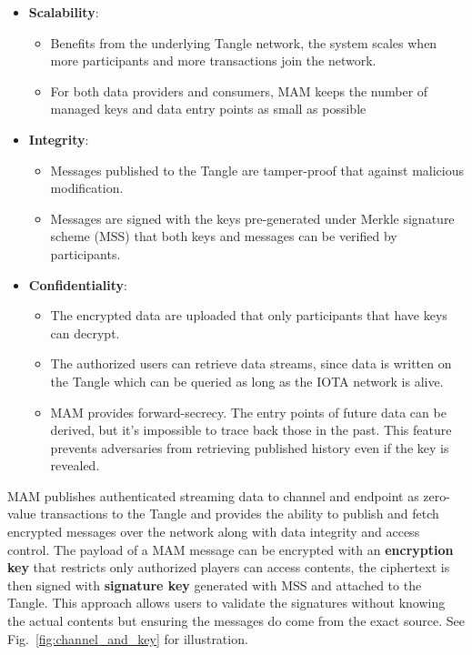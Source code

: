 \documentclass[conference]{IEEEtran}
\begin{document}
\begin{itemize}
    \item \textbf{Scalability}:
	\begin{itemize}
		\item Benefits from the underlying Tangle network, the system scales when more participants and more transactions join the network. 
    	\item For both data providers and consumers, MAM keeps the number of managed keys and data entry points as small as possible
    \end{itemize}    
    \item \textbf{Integrity}: 
	\begin{itemize}    	
        \item Messages published to the Tangle are tamper-proof that against malicious modification.
    	\item Messages are signed with the keys pre-generated under Merkle signature scheme\cite{MSS} (MSS) that both keys and messages can be verified by participants.
    \end{itemize}
    \item \textbf{Confidentiality}:
    \begin{itemize}    	
    	\item The encrypted data are uploaded that only participants that have keys can decrypt.
    	\item The authorized users can retrieve data streams, since data is written on the Tangle which can be queried as long as the IOTA network is alive.
    	\item MAM provides forward-secrecy. The entry points of future data can be derived, but it's impossible to trace back those in the past. This feature prevents adversaries from retrieving published history even if the key is revealed.
    \end{itemize}
\end{itemize}

MAM publishes authenticated streaming data to channel and endpoint as zero-value transactions to the Tangle and provides the ability to publish and fetch encrypted messages over the network along with data integrity and access control. The payload of a MAM message can be encrypted with an \textbf{encryption key} that restricts only authorized players can access contents, the ciphertext is then signed with \textbf{signature key} generated with MSS and attached to the Tangle. This approach allows users to validate the signatures without knowing the actual contents but ensuring the messages do come from the exact source. See Fig.~\ref{fig:channel_and_key} for illustration. 
\end{document}
